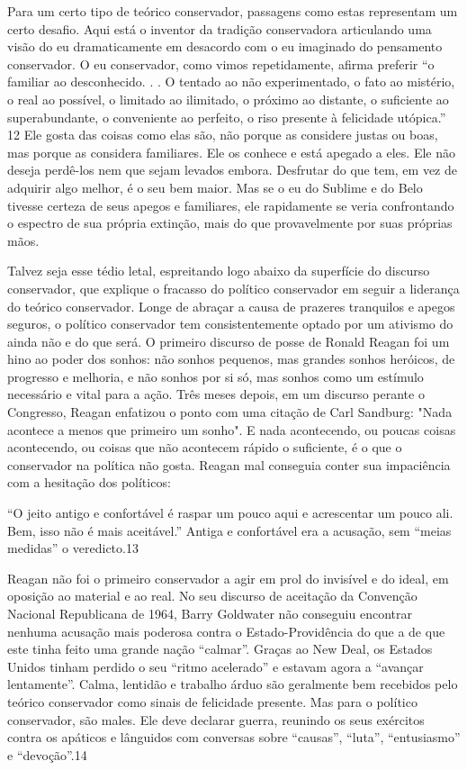 Para um certo tipo de teórico conservador, passagens como estas representam um certo desafio. Aqui está o inventor da tradição conservadora articulando uma visão do eu dramaticamente em desacordo com o eu imaginado do pensamento conservador. O eu conservador, como vimos repetidamente, afirma preferir “o familiar ao desconhecido. . . O tentado ao não experimentado, o fato ao mistério, o real ao possível, o limitado ao ilimitado, o próximo ao distante, o suficiente ao superabundante, o conveniente ao perfeito, o riso presente à felicidade utópica.” {\color{blue}12} Ele gosta das coisas como elas são, não porque as considere justas ou boas, mas porque as considera familiares. Ele os conhece e está apegado a eles. Ele não deseja perdê-los nem que sejam levados embora. Desfrutar do que tem, em vez de adquirir algo melhor, é o seu bem maior. Mas se o eu do Sublime e do Belo tivesse certeza de seus apegos e familiares, ele rapidamente se veria confrontando o espectro de sua própria extinção, mais do que provavelmente por suas próprias mãos.
 \par 
Talvez seja esse tédio letal, espreitando logo abaixo da superfície do discurso conservador, que explique o fracasso do político conservador em seguir a liderança do teórico conservador. Longe de abraçar a causa de prazeres tranquilos e apegos seguros, o político conservador tem consistentemente optado por um ativismo do ainda não e do que será. O primeiro discurso de posse de Ronald Reagan foi um hino ao poder dos sonhos: não sonhos pequenos, mas grandes sonhos heróicos, de progresso e melhoria, e não sonhos por si só, mas sonhos como um estímulo necessário e vital para a ação. Três meses depois, em um discurso perante o Congresso, Reagan enfatizou o ponto com uma citação de Carl Sandburg: "Nada acontece a menos que primeiro um sonho". E nada acontecendo, ou poucas coisas acontecendo, ou coisas que não acontecem rápido o suficiente, é o que o conservador na política não gosta. Reagan mal conseguia conter sua impaciência com a hesitação dos políticos:
 \par 
“O jeito antigo e confortável é raspar um pouco aqui e acrescentar um pouco ali. Bem, isso não é mais aceitável.” Antiga e confortável era a acusação, sem “meias medidas” o veredicto.{\color{blue}13}
 \par 
Reagan não foi o primeiro conservador a agir em prol do invisível e do ideal, em oposição ao material e ao real. No seu discurso de aceitação da Convenção Nacional Republicana de 1964, Barry Goldwater não conseguiu encontrar nenhuma acusação mais poderosa contra o Estado-Providência do que a de que este tinha feito uma grande nação “calmar”. Graças ao New Deal, os Estados Unidos tinham perdido o seu “ritmo acelerado” e estavam agora a “avançar lentamente”. Calma, lentidão e trabalho árduo são geralmente bem recebidos pelo teórico conservador como sinais de felicidade presente. Mas para o político conservador, são males. Ele deve declarar guerra, reunindo os seus exércitos contra os apáticos e lânguidos com conversas sobre “causas”, “luta”, “entusiasmo” e “devoção”.{\color{blue}14}
